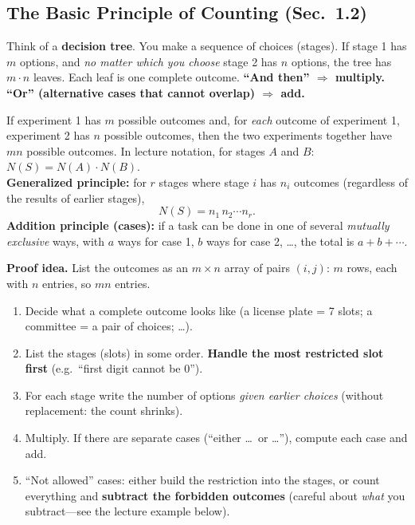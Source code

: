 \documentclass[11pt]{article}
\let\oldsubsection\subsection
\renewcommand{\subsection}{\Needspace{14\baselineskip}\oldsubsection}
\begin{document}
\subsection{The Basic Principle of Counting (Sec.\ 1.2)}

\begin{ideabox}
Think of a \textbf{decision tree}. You make a sequence of choices (stages). If stage 1 has $m$ options, and \emph{no matter which you choose} stage 2 has $n$ options, the tree has $m\cdot n$ leaves. Each leaf is one complete outcome. \textbf{``And then'' $\Rightarrow$ multiply.} \textbf{``Or'' (alternative cases that cannot overlap) $\Rightarrow$ add.}
\end{ideabox}

\begin{defbox}
If experiment 1 has $m$ possible outcomes and, for \emph{each} outcome of experiment 1, experiment 2 has $n$ possible outcomes, then the two experiments together have $mn$ possible outcomes. In lecture notation, for stages $A$ and $B$: $N(S)=N(A)\cdot N(B)$.\\
\textbf{Generalized principle:} for $r$ stages where stage $i$ has $n_i$ outcomes (regardless of the results of earlier stages),
\[ N(S)=n_1\,n_2\cdots n_r. \]
\textbf{Addition principle (cases):} if a task can be done in one of several \emph{mutually exclusive} ways, with $a$ ways for case 1, $b$ ways for case 2, \dots, the total is $a+b+\cdots$.
\end{defbox}

\textbf{Proof idea.} List the outcomes as an $m\times n$ array of pairs $(i,j)$: $m$ rows, each with $n$ entries, so $mn$ entries.

\begin{methodbox}
\begin{enumerate}
\item Decide what a complete outcome looks like (a license plate = 7 slots; a committee = a pair of choices; \dots).
\item List the stages (slots) in some order. \textbf{Handle the most restricted slot first} (e.g.\ ``first digit cannot be 0'').
\item For each stage write the number of options \emph{given earlier choices} (without replacement: the count shrinks).
\item Multiply. If there are separate cases (``either \dots\ or \dots''), compute each case and add.
\item ``Not allowed'' cases: either build the restriction into the stages, or count everything and \textbf{subtract the forbidden outcomes} (careful about \emph{what} you subtract---see the lecture example below).
\end{enumerate}
\end{methodbox}
\end{document}
